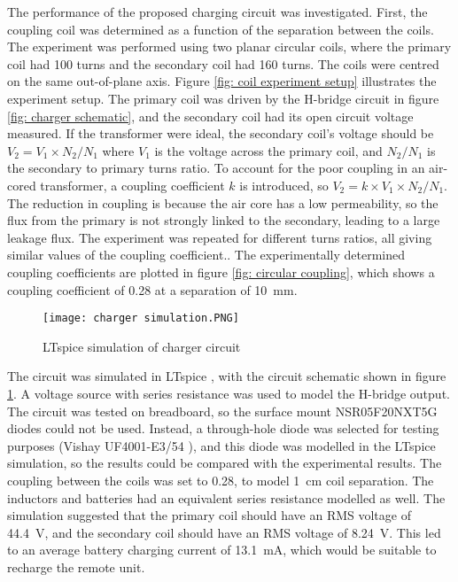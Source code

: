 The performance of the proposed charging circuit was investigated. First, the coupling coil was determined as a function of the separation between the coils. The experiment was performed using two planar circular coils, where the primary coil had 100 turns and the secondary coil had 160 turns. The coils were centred on the same out-of-plane axis. Figure \ref{fig: coil experiment setup} illustrates the experiment setup. The primary coil was driven by the H-bridge circuit in figure \ref{fig: charger schematic}, and the secondary coil had its open circuit voltage measured. If the transformer were ideal, the secondary coil's voltage should be $V_2 = V_1 \times N_2 / N_1$ where $V_1$ is the voltage across the primary coil, and $N_2 / N_1$ is the secondary to primary turns ratio. To account for the poor coupling in an air-cored transformer, a coupling coefficient $k$ is introduced, so $V_2 = k \times V_1 \times N_2 / N_1$. The reduction in coupling is because the air core has a low permeability, so the flux from the primary is not strongly linked to the secondary, leading to a large leakage flux. The experiment was repeated for different turns ratios, all giving similar values of the coupling coefficient.. The experimentally determined coupling coefficients are plotted in figure \ref{fig: circular coupling}, which shows a coupling coefficient of 0.28 at a separation of \SI{10}{\milli\metre}.\\


\begin{figure}[htbp]
	\centering
	\texttt{[image: charger simulation.PNG]}
	\caption{LTspice simulation of charger circuit}
	\label{fig: charger simulation}
\end{figure}

The circuit was simulated in LTspice \cite{ltspice}, with the circuit schematic shown in figure \ref{fig: charger simulation}. A voltage source with series resistance was used to model the H-bridge output. The circuit was tested on breadboard, so the surface mount NSR05F20NXT5G diodes could not be used. Instead, a through-hole diode was selected for testing purposes (Vishay UF4001-E3/54 \cite{tht_diode}), and this diode was modelled in the LTspice simulation, so the results could be compared with the experimental results. The coupling between the coils was set to 0.28, to model \SI{1}{cm} coil separation. The inductors and batteries had an equivalent series resistance modelled as well. The simulation suggested that the primary coil should have an RMS voltage of \SI{44.4}{\volt}, and the secondary coil should have an RMS voltage of \SI{8.24}{\volt}. This led to an average battery charging current of \SI{13.1}{\milli\ampere}, which would be suitable to recharge the remote unit.\\ %

